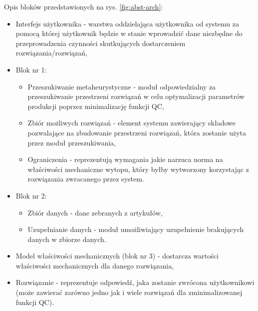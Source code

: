 Opis bloków przedstawionych na rys. \ref{fig:abst-arch}:
\begin{itemize}
    \item Interfejs użytkownika - warstwa oddzielająca użytkownika od systemu za pomocą której użytkownik będzie w stanie wprowadzić dane niezbędne do przeprowadzenia czynności skutkujących dostarczeniem rozwiązania/rozwiązań,
    \item Blok nr 1:
    \begin{itemize}
        \item Przeszukiwanie metaheurystyczne - moduł odpowiedzialny za przeszukiwanie przestrzeni rozwiązań w celu optymalizacji parametrów produkcji poprzez minimalizację funkcji QC,
        \item Zbiór możliwych rozwiązań - element systemu zawierający składowe pozwalające na zbudowanie przestrzeni rozwiązań, która zostanie użyta przez moduł przeszukiwania, 
        \item Ograniczenia - reprezentują wymagania jakie narzuca norma na właściwości mechaniczne wytopu, który byłby wytworzony korzystając z rozwiązania zwracanego przez system.
    \end{itemize}
    \item Blok nr 2:
    \begin{itemize}
        \item Zbiór danych - dane zebranych z artykułów,
        \item Uzupełnianie danych - moduł umożliwiający uzupełnienie brakujących danych w zbiorze danych. 
    \end{itemize}
    \item Model właściwości mechanicznych (blok nr 3) - dostarcza wartości właściwości mechanicznych dla danego rozwiązania,
    \item Rozwiązanie - reprezentuje odpowiedź, jaka zostanie zwrócona użytkownikowi (może zawierać zarówno jedno jak i wiele rozwiązań dla zminimalizowanej funkcji QC).
\end{itemize}







